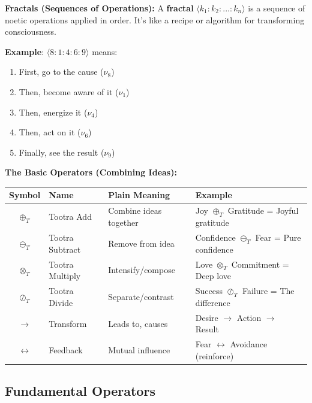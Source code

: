 \documentclass[11pt,twoside]{book}
\newcommand{\noe}[1]{\nu_{#1}}
\newcommand{\Tadd}{\oplus_T}
\newcommand{\Tsub}{\ominus_T}
\newcommand{\Tmul}{\otimes_T}
\newcommand{\Tdiv}{\oslash_T}
\begin{document}
\begin{tcolorbox}[colback=blue!5!white,colframe=blue!65!black,title=\textbf{Plain English: Understanding TKS Building Blocks},breakable]
\textbf{Fractals (Sequences of Operations):}
A \textbf{fractal} $\langle k_1 : k_2 : ... : k_n \rangle$ is a sequence of noetic operations applied in order. It's like a recipe or algorithm for transforming consciousness.

\textbf{Example}: $\langle 8 : 1 : 4 : 6 : 9 \rangle$ means:
\begin{enumerate}
    \item First, go to the cause ($\noe{8}$)
    \item Then, become aware of it ($\noe{1}$)
    \item Then, energize it ($\noe{4}$)
    \item Then, act on it ($\noe{6}$)
    \item Finally, see the result ($\noe{9}$)
\end{enumerate}

\textbf{The Basic Operators (Combining Ideas):}
\begin{center}
\footnotesize
\begin{tabularx}{\textwidth}{c|l|X|X}
\toprule
\textbf{Symbol} & \textbf{Name} & \textbf{Plain Meaning} & \textbf{Example} \\
\midrule
$\Tadd$ & Tootra Add & Combine ideas together & Joy $\Tadd$ Gratitude = Joyful gratitude \\
$\Tsub$ & Tootra Subtract & Remove from idea & Confidence $\Tsub$ Fear = Pure confidence \\
$\Tmul$ & Tootra Multiply & Intensify/compose & Love $\Tmul$ Commitment = Deep love \\
$\Tdiv$ & Tootra Divide & Separate/contrast & Success $\Tdiv$ Failure = The difference \\
$\to$ & Transform & Leads to, causes & Desire $\to$ Action $\to$ Result \\
$\leftrightarrow$ & Feedback & Mutual influence & Fear $\leftrightarrow$ Avoidance (reinforce) \\
\bottomrule
\end{tabularx}
\end{center}

\end{tcolorbox}

\subsection{Fundamental Operators}
\end{document}
